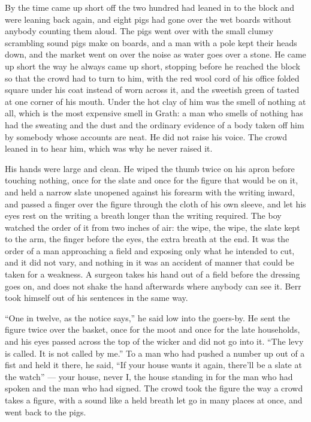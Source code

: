 By the time  came up short off  the two hundred had leaned in to the block and were leaning back again, and eight pigs had gone over the wet boards without anybody counting them aloud. The pigs went over with the small clumsy scrambling sound pigs make on boards, and a man with a pole kept their heads down, and the market went on over the noise as water goes over a stone. He came up short the way he always came up short, stopping before he reached the block so that the crowd had to turn to him, with the red wool cord of his office folded square under his coat instead of worn across it, and the sweetish green of tasted  at one corner of his mouth. Under the hot clay of him was the smell of nothing at all, which is the most expensive smell in Grath: a man who smells of nothing has had the sweating and the dust and the ordinary evidence of a body taken off him by somebody whose accounts are neat. He did not raise his voice. The crowd leaned in to hear him, which was why he never raised it.

His hands were large and clean. He wiped the thumb twice on his apron before touching nothing, once for the slate and once for the figure that would be on it, and held a narrow slate unopened against his forearm with the writing inward, and passed a finger over the figure through the cloth of his own sleeve, and let his eyes rest on the writing a breath longer than the writing required. The boy watched the order of it from two inches of air: the wipe, the wipe, the slate kept to the arm, the finger before the eyes, the extra breath at the end. It was the order of a man approaching a field and exposing only what he intended to cut, and it did not vary, and nothing in it was an accident of manner that could be taken for a weakness. A surgeon takes his hand out of a field before the dressing goes on, and does not shake the hand afterwards where anybody can see it. Berr took himself out of his sentences in the same way.

“One in twelve, as the notice says,” he said low into the goers-by. He sent the figure twice over the basket, once for the moot and once for the late households, and his eyes passed across the top of the wicker and did not go into it. “The levy is called. It is not called by me.” To a man who had pushed a number up out of a fist and held it there, he said, “If your house wants it again, there'll be a slate at the watch” --- your house, never I, the house standing in for the man who had spoken and the man who had signed. The crowd took the figure the way a crowd takes a figure, with a sound like a held breath let go in many places at once, and went back to the pigs.

